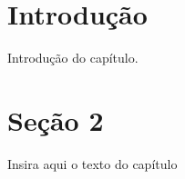 \iffalse  \fi %

\section{Introdução}
    Introdução do capítulo.


\section{Seção 2}

    Insira aqui o texto do capítulo